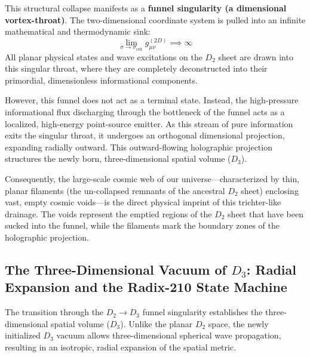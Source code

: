 \documentclass[11pt,a4paper]{article}
\theoremstyle{plain}
\theoremstyle{definition}
\theoremstyle{remark}
\begin{document}
This structural collapse manifests as a \textbf{funnel singularity (a dimensional vortex-throat)}. The two-dimensional coordinate system is pulled into an infinite mathematical and thermodynamic sink:
\begin{equation}
\lim_{\sigma \to \sigma_{\text{crit}}} g_{\mu\nu}^{(2D)} \implies \infty
\end{equation}
All planar physical states and wave excitations on the $D_2$ sheet are drawn into this singular throat, where they are completely deconstructed into their primordial, dimensionless informational components. 

However, this funnel does not act as a terminal state. Instead, the high-pressure informational flux discharging through the bottleneck of the funnel acts as a localized, high-energy point-source emitter. As this stream of pure information exits the singular throat, it undergoes an orthogonal dimensional projection, expanding radially outward. This outward-flowing holographic projection structures the newly born, three-dimensional spatial volume ($D_3$). 

Consequently, the large-scale cosmic web of our universe—characterized by thin, planar filaments (the un-collapsed remnants of the ancestral $D_2$ sheet) enclosing vast, empty cosmic voids—is the direct physical imprint of this trichter-like drainage. The voids represent the emptied regions of the $D_2$ sheet that have been sucked into the funnel, while the filaments mark the boundary zones of the holographic projection.

\subsection{The Three-Dimensional Vacuum of $D_3$: Radial Expansion and the Radix-210 State Machine}
The transition through the $D_2 \to D_3$ funnel singularity establishes the three-dimensional spatial volume ($D_3$). Unlike the planar $D_2$ space, the newly initialized $D_3$ vacuum allows three-dimensional spherical wave propagation, resulting in an isotropic, radial expansion of the spatial metric. 
\end{document}
